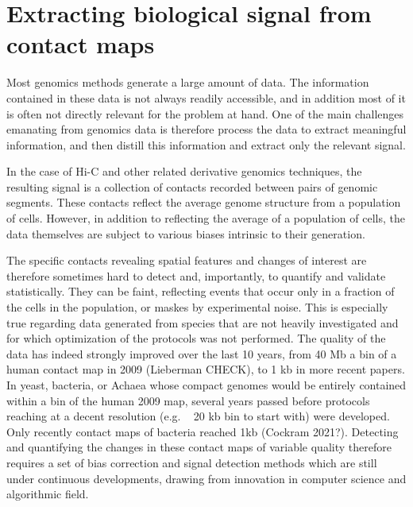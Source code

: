 
\chapter{Extracting biological signal from contact maps} %

\label{ch:02-01} %


Most genomics methods generate a large amount of data. The information contained in these data is not always readily accessible, and in addition most of it is often not directly relevant for the problem at hand. One of the main challenges emanating from genomics data is therefore process the data to extract meaningful information, and then distill this information and extract only the relevant signal.

In the case of Hi-C and other related derivative genomics techniques, the resulting signal is a collection of contacts recorded between pairs of genomic segments. These contacts reflect the average genome structure from a population of cells. However, in addition to reflecting the average of a population of cells, the data themselves are subject to various biases intrinsic to their generation.

The specific contacts revealing spatial features and changes of interest are therefore sometimes hard to detect and, importantly, to quantify and validate statistically. They can be faint, reflecting events that occur only in a fraction of the cells in the population, or maskes by experimental noise. This is especially true regarding data generated from species that are not heavily investigated and for which optimization of the protocols was not performed. The quality of the data has indeed strongly improved over the last 10 years, from 40 Mb a bin of a human contact map in 2009 (Lieberman  CHECK), to 1 kb in more recent papers. In yeast, bacteria, or Achaea whose compact genomes would be entirely contained within a bin of the human 2009 map, several years passed before protocols reaching at a decent resolution (e.g. ~ 20 kb bin to start with) were developed. Only recently contact maps of bacteria reached 1kb (Cockram 2021?).  Detecting and quantifying the changes in these contact maps of variable quality therefore requires a set of bias correction and signal detection methods which are still under continuous developments, drawing from innovation in computer science and algorithmic field. 

